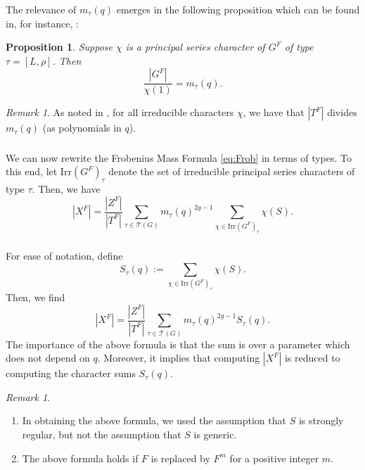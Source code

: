 \documentclass[12pt]{amsart}
\theoremstyle{plain}
\newtheorem{prop}[thm]{Proposition}
\theoremstyle{definition}
\theoremstyle{remark}
\newtheorem{rem}[thm]{Remark}
\newcommand{\bX}{{X}}
\newcommand{\cT}{\mathcal{T}}
\newcommand{\Irr}{\mathrm{Irr}}
\begin{document}
\subsubsection{} The relevance of $m_\tau(q)$ emerges in the following proposition which can be found in, for instance,  \cite[Corollary 2.6.6]{GM20}: 

  \begin{prop} \label{p:mtau}
  Suppose $\chi$ is a principal series character of $G^F$ of type $\tau=[L,\rho]$. Then 
\[
\displaystyle   \frac{|G^F|}{\chi(1)} = m_\tau(q). 
\] 
\end{prop}

\begin{rem} \label{r:divide} As noted in \cite[Remark 2.3.7]{GM20}, for all irreducible characters $\chi$, we have that
$|T^F|$ divides $m_\tau(q)$ (as polynomials in $q$).
\end{rem} 
   
 \subsubsection{} We can now rewrite the Frobenius Mass Formula \eqref{eq:Frob} in terms of types. To this end, let  $\Irr(G^F)_\tau$ denote the set of irreducible principal series characters of type $\tau$. 
Then, we have
 \[
|\bX^F| = \frac{|Z^F|}{|T^F|} \sum_{\tau \in \cT(G)} m_\tau(q)^{2g-1}  \sum_{\chi \in \Irr(G^F)_\tau} \chi(S). 
\] 

\subsubsection{} \label{s:Stau} For ease of notation, define   
\[
\boxed{
S_\tau(q):= \displaystyle \sum_{\chi \in \Irr(G^F)_\tau} \chi(S).}
\]
Then, we find
 \[
|\bX^F| = \frac{|Z^F|}{|T^F|} \sum_{\tau\in \cT(G)} m_\tau(q)^{2g-1} S_\tau(q).
\] 
The importance of the above formula is that the sum is over a parameter which does not depend on $q$. Moreover, it implies that computing $|\bX^F|$ is reduced to computing the character sums $S_\tau(q)$. 
\begin{rem} 
\begin{enumerate} 
\item[(i)] In obtaining the above formula, we used the assumption that $S$ is strongly regular, but not the assumption that $S$ is generic.
\item[(ii)] The above formula holds if $F$ is replaced by $F^m$ for a positive integer $m$. 
\end{enumerate} 
\end{rem} 
\end{document}
